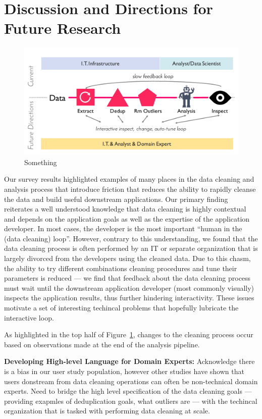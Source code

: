 \section{Discussion and Directions for Future Research}\label{sec:future}


\begin{figure}
  \centering
  \includegraphics[width=.8\columnwidth]{datafigs/arch}
  \caption{Something}
  \label{f:arch}
\end{figure}

Our survey results highlighted examples of many places in the data cleaning and analysis process that introduce friction that reduces the ability to rapidly cleanse the data and build useful downstream applications.
Our primary finding reiterates a well understood knowledge that data cleaning is highly contextual and depends on the application goals as well as the expertise of the application developer.  In most cases, the developer is the most important ``human in the (data cleaning) loop''.  However, contrary to this understanding, we found that the data cleaning process is often performed by an IT or separate organization that is largely divorced from the developers using the cleaned data.  Due to this chasm, the ability to try different combinations cleaning procedures and tune their parameters is reduced --- we find that feedback about the data cleaning process must wait until the downstream application developer (most commonly visually) inspects the application results, thus further hindering interactivity.  These issues motivate a set of interesting techincal problems that hopefully lubricate the interactive loop.

As highlighted in the top half of Figure~\ref{f:arch}, changes to the cleaning process occur based on observations made at the end of the analysis pipeline.  


\noindent\textbf{Developing High-level Language for Domain Experts:}  Acknowledge there is a bias in our user study population, however other studies have shown that users donstream from data cleaning operations can often be non-technical domain experts.  Need to bridge the high level specification of the data cleaning goals --- providing exapmles of deduplication goals, what outliers are --- with the techincal organization that is tasked with performing data cleaning at scale.

